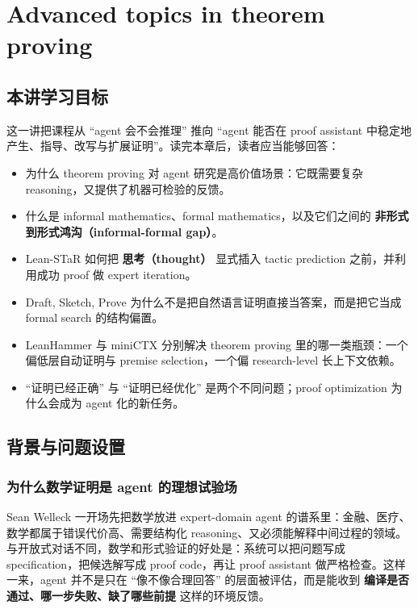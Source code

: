 \chapter{Advanced topics in theorem proving}
\label{chap:lec10_advanced_theorem_proving}
\section{本讲学习目标}

这一讲把课程从 ``agent 会不会推理'' 推向 ``agent 能否在 proof assistant 中稳定地产生、指导、改写与扩展证明''。读完本章后，读者应当能够回答：
\begin{itemize}
\item 为什么 theorem proving 对 agent 研究是高价值场景：它既需要复杂 reasoning，又提供了机器可检验的反馈。
\item 什么是 informal mathematics、formal mathematics，以及它们之间的 \textbf{非形式到形式鸿沟（informal-formal gap）}。
\item Lean-STaR 如何把 \textbf{思考（thought）} 显式插入 tactic prediction 之前，并利用成功 proof 做 expert iteration。
\item Draft, Sketch, Prove 为什么不是把自然语言证明直接当答案，而是把它当成 formal search 的结构偏置。
\item LeanHammer 与 miniCTX 分别解决 theorem proving 里的哪一类瓶颈：一个偏低层自动证明与 premise selection，一个偏 research-level 长上下文依赖。
\item ``证明已经正确'' 与 ``证明已经优化'' 是两个不同问题；proof optimization 为什么会成为 agent 化的新任务。
\end{itemize}

\section{背景与问题设置}

\subsection{为什么数学证明是 agent 的理想试验场}

Sean Welleck 一开场先把数学放进 expert-domain agent 的谱系里：金融、医疗、数学都属于错误代价高、需要结构化 reasoning、又必须能解释中间过程的领域。与开放式对话不同，数学和形式验证的好处是：系统可以把问题写成 specification，把候选解写成 proof code，再让 proof assistant 做严格检查。这样一来，agent 并不是只在 ``像不像合理回答'' 的层面被评估，而是能收到 \textbf{编译是否通过、哪一步失败、缺了哪些前提} 这样的环境反馈。

